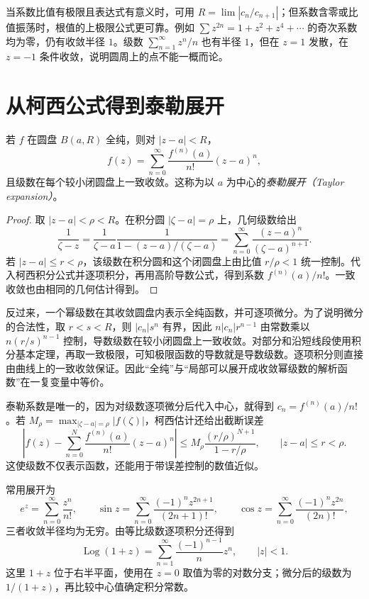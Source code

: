 当系数比值有极限且表达式有意义时，可用 $R=\lim|c_n/c_{n+1}|$；但系数含零或比值振荡时，根值的上极限公式更可靠。例如 $\sum z^{2n}=1+z^2+z^4+\cdots$ 的奇次系数均为零，仍有收敛半径 $1$。级数 $\sum_{n=1}^\infty z^n/n$ 也有半径 $1$，但在 $z=1$ 发散，在 $z=-1$ 条件收敛，说明圆周上的点不能一概而论。

\section{从柯西公式得到泰勒展开}

\begin{theorem}[泰勒定理与解析性]
\label{thm:ca-taylor}
若 $f$ 在圆盘 $B(a,R)$ 全纯，则对 $|z-a|<R$，
\begin{equation}
 f(z)=\sum_{n=0}^\infty\frac{f^{(n)}(a)}{n!}(z-a)^n,
 \label{eq:ca-taylor}
\end{equation}
且级数在每个较小闭圆盘上一致收敛。这称为以 $a$ 为中心的\emph{泰勒展开（Taylor expansion）}。
\end{theorem}
\begin{proof}
取 $|z-a|<\rho<R$。在积分圆 $|\zeta-a|=\rho$ 上，几何级数给出
\[
 \frac1{\zeta-z}
 =\frac1{\zeta-a}\frac1{1-(z-a)/(\zeta-a)}
 =\sum_{n=0}^\infty\frac{(z-a)^n}{(\zeta-a)^{n+1}}.
\]
若 $|z-a|\le r<\rho$，该级数在积分圆和这个闭圆盘上由比值 $r/\rho<1$ 统一控制。代入柯西积分公式并逐项积分，再用高阶导数公式，得到系数 $f^{(n)}(a)/n!$。一致收敛也由相同的几何估计得到。
\end{proof}

反过来，一个幂级数在其收敛圆盘内表示全纯函数，并可逐项微分。为了说明微分的合法性，取 $r<s<R$，则 $|c_n|s^n$ 有界，因此 $n|c_n|r^{n-1}$ 由常数乘以 $n(r/s)^{n-1}$ 控制，导数级数在较小闭圆盘上一致收敛。对部分和沿短线段使用积分基本定理，再取一致极限，可知极限函数的导数就是导数级数。逐项积分则直接由曲线上的一致收敛保证。因此“全纯”与“局部可以展开成收敛幂级数的解析函数”在一复变量中等价。

泰勒系数是唯一的，因为对级数逐项微分后代入中心，就得到 $c_n=f^{(n)}(a)/n!$。若 $M_\rho=\max_{|\zeta-a|=\rho}|f(\zeta)|$，柯西估计还给出截断误差
\begin{equation}
 \left|f(z)-\sum_{n=0}^{N}\frac{f^{(n)}(a)}{n!}(z-a)^n\right|
 \le M_\rho\frac{(r/\rho)^{N+1}}{1-r/\rho},\qquad |z-a|\le r<\rho.
 \label{eq:ca-taylor-error}
\end{equation}
这使级数不仅表示函数，还能用于带误差控制的数值近似。

常用展开为
\[
 e^z=\sum_{n=0}^\infty\frac{z^n}{n!},\qquad
 \sin z=\sum_{n=0}^\infty\frac{(-1)^nz^{2n+1}}{(2n+1)!},\qquad
 \cos z=\sum_{n=0}^\infty\frac{(-1)^nz^{2n}}{(2n)!},
\]
三者收敛半径均为无穷。由等比级数逐项积分还得到
\[
 \operatorname{Log}(1+z)=\sum_{n=1}^\infty\frac{(-1)^{n-1}}n z^n,
 \qquad |z|<1.
\]
这里 $1+z$ 位于右半平面，使用在 $z=0$ 取值为零的对数分支；微分后的级数为 $1/(1+z)$，再比较中心值确定积分常数。


